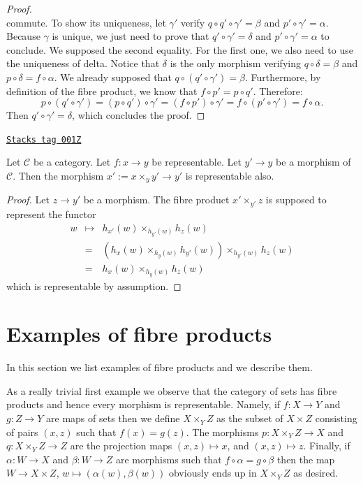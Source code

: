 \begin{proof}
$$$$
commute. To show its uniqueness, let $\gamma'$ verify $ q\circ q'\circ\gamma' =
\beta $ and $ p'\circ \gamma' = \alpha $. Because $\gamma$ is unique, we just
need to prove that $ q'\circ\gamma' = \delta $ and $ p'\circ\gamma' = \alpha $
to conclude. We supposed the second equality. For the first one, we also need
to use the uniqueness of delta. Notice that $\delta$ is the only morphism
verifying $ q\circ\delta = \beta $ and $ p\circ\delta = f\circ\alpha $. We
already supposed that $ q\circ (q'\circ\gamma') = \beta $. Furthermore, by
definition of the fibre product, we know that $ f\circ p' = p\circ q' $.
Therefore:
$$
p\circ (q'\circ\gamma') =
(p\circ q')\circ\gamma' =
(f\circ p')\circ\gamma' =
f\circ (p'\circ\gamma') = f\circ\alpha.
$$
Then $ q'\circ\gamma' = \delta $, which concludes the proof.
\end{proof}

\begin{lemma}
\label{categories-lemma-base-change-representable}
\href{https://stacks.math.columbia.edu/tag/001Z}{\texttt{Stacks tag 001Z}}

Let $\mathcal{C}$ be a category.
Let $f : x \to y$ be representable.
Let $y' \to y$ be a morphism of $\mathcal{C}$.
Then the morphism $x' := x \times_y y' \to y'$ is representable also.
\end{lemma}

\begin{proof}
Let $z \to y'$ be a morphism. The fibre product
$x' \times_{y'} z$ is supposed to represent the
functor
\begin{eqnarray*}
w & \mapsto & h_{x'}(w)\times_{h_{y'}(w)} h_z(w) \\
& = & (h_x(w) \times_{h_y(w)} h_{y'}(w)) \times_{h_{y'}(w)} h_z(w) \\
& = & h_x(w) \times_{h_y(w)} h_z(w)
\end{eqnarray*}
which is representable by assumption.
\end{proof}

\section{Examples of fibre products}
\label{categories-section-example-fibre-products}
In this section we list examples of fibre products and
we describe them.

\medskip\noindent
As a really trivial first example we observe
that the category of sets has fibre products and hence every
morphism is representable. Namely, if $f : X \to Y$
and $g : Z \to Y$ are maps of sets then we define
$X \times_Y Z$ as the subset of $X \times Z$ consisting
of pairs $(x, z)$ such that $f(x) = g(z)$. The morphisms
$p : X \times_Y Z \to X$ and $q : X \times_Y Z \to Z$ are
the projection maps $(x, z) \mapsto x$, and $(x, z) \mapsto z$.
Finally, if $\alpha : W \to X$ and $\beta : W \to Z$
are morphisms such that $f \circ \alpha = g \circ \beta$
then the map $W \to X \times Z$, $w\mapsto (\alpha(w), \beta(w))$
obviously ends up in $X \times_Y Z$ as desired.

